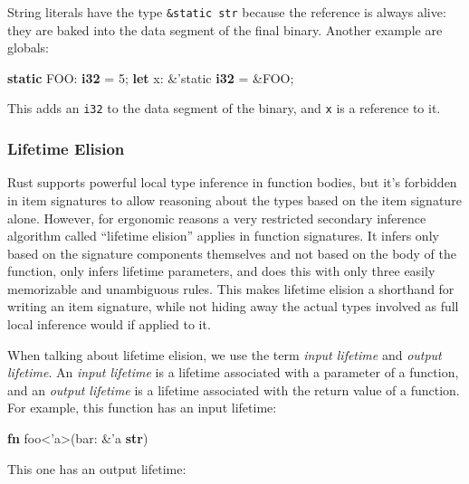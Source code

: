 \documentclass[a4paper,]{book}
\newenvironment{Shaded}{\begin{snugshade}}{\end{snugshade}}
\newcommand{\KeywordTok}[1]{\textcolor[rgb]{0.13,0.29,0.53}{\textbf{{#1}}}}
\newcommand{\DecValTok}[1]{\textcolor[rgb]{0.00,0.00,0.81}{{#1}}}
\newcommand{\OtherTok}[1]{\textcolor[rgb]{0.56,0.35,0.01}{{#1}}}
\newcommand{\NormalTok}[1]{{#1}}
\begin{document}
String literals have the type \texttt{\&\textquotesingle{}static\ str}
because the reference is always alive: they are baked into the data
segment of the final binary. Another example are globals:

\begin{Shaded}
\begin{Highlighting}[]
\KeywordTok{static} \NormalTok{FOO: }\KeywordTok{i32} \NormalTok{= }\DecValTok{5}\NormalTok{;}
\KeywordTok{let} \NormalTok{x: &}\OtherTok{'static} \KeywordTok{i32} \NormalTok{= &FOO;}
\end{Highlighting}
\end{Shaded}

This adds an \texttt{i32} to the data segment of the binary, and
\texttt{x} is a reference to it.

\subsubsection{Lifetime Elision}\label{lifetime-elision}

Rust supports powerful local type inference in function bodies, but it's
forbidden in item signatures to allow reasoning about the types based on
the item signature alone. However, for ergonomic reasons a very
restricted secondary inference algorithm called ``lifetime elision''
applies in function signatures. It infers only based on the signature
components themselves and not based on the body of the function, only
infers lifetime parameters, and does this with only three easily
memorizable and unambiguous rules. This makes lifetime elision a
shorthand for writing an item signature, while not hiding away the
actual types involved as full local inference would if applied to it.

When talking about lifetime elision, we use the term \emph{input
lifetime} and \emph{output lifetime}. An \emph{input lifetime} is a
lifetime associated with a parameter of a function, and an \emph{output
lifetime} is a lifetime associated with the return value of a function.
For example, this function has an input lifetime:

\begin{Shaded}
\begin{Highlighting}[]
\KeywordTok{fn} \NormalTok{foo<}\OtherTok{'a}\NormalTok{>(bar: &}\OtherTok{'a} \KeywordTok{str}\NormalTok{)}
\end{Highlighting}
\end{Shaded}

This one has an output lifetime:
\end{document}
